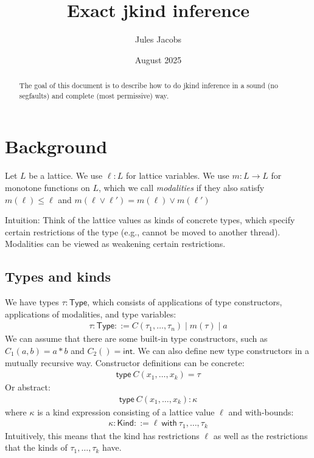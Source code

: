 \documentclass{article}
\title{Exact jkind inference}
\author{Jules Jacobs}
\date{August 2025}
\newcommand{\Type}{\mathsf{Type}}
\newcommand{\type}{\mathsf{type\ }}
\newcommand{\Kind}{\mathsf{Kind}}
\newcommand{\with}{\mathsf{\ with\ }}
\begin{document}
\maketitle

\begin{abstract}
    The goal of this document is to describe how to do jkind inference in a sound (no segfaults) and complete (most permissive) way.
\end{abstract}


\section{Background}

Let $L$ be a lattice. We use $\ell : L$ for lattice variables. We use $m : L \to L$ for monotone functions on $L$, which we call \emph{modalities} if they also satisfy $m(\ell) \leq \ell$ and $m(\ell \vee \ell') = m(\ell) \vee m(\ell')$

Intuition: Think of the lattice values as kinds of concrete types, which specify certain restrictions of the type (e.g., cannot be moved to another thread).
Modalities can be viewed as weakening certain restrictions.

\subsection*{Types and kinds}

We have types $\tau : \mathsf{Type}$, which consists of applications of type constructors, applications of modalities, and type variables:
\begin{align*}
    \tau : \Type ::= C(\tau_1, \dots, \tau_n) \mid m(\tau) \mid a
\end{align*}
We can assume that there are some built-in type constructors, such as $C_1(a,b) = a \ast b$ and $C_2() = \mathsf{int}$.
We can also define new type constructors in a mutually recursive way.
Constructor definitions can be concrete:
\begin{align*}
    \type C(x_1, \dots, x_k) = \tau
\end{align*}
Or abstract:
\begin{align*}
    \type C(x_1, \dots, x_k) : \kappa
\end{align*}
where $\kappa$ is a kind expression consisting of a lattice value $\ell$ and with-bounds:
\begin{align*}
    \kappa : \Kind ::= \ell \with \tau_1,\dots,\tau_k
\end{align*}
Intuitively, this means that the kind has restrictions $\ell$ as well as the restrictions that the kinds of $\tau_1,\dots,\tau_k$ have.
\end{document}
